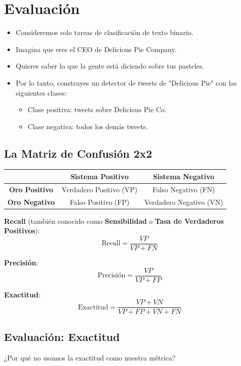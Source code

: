 \documentclass[11pt,fleqn]{book} %
\begin{document}
\section{Evaluación}

\begin{itemize}
 \item Consideremos solo tareas de clasificación de texto binario.
 \item Imagina que eres el CEO de Delicious Pie Company.
 \item Quieres saber lo que la gente está diciendo sobre tus pasteles.
 \item Por lo tanto, construyes un detector de tweets de "Delicious Pie" con las siguientes clases:
\begin{itemize}
\item Clase positiva: tweets sobre Delicious Pie Co.
\item Clase negativa: todos los demás tweets.
\end{itemize}
\end{itemize}



\subsection{La Matriz de Confusión 2x2}
\begin{table}[h]
\centering
\begin{tabular}{|c|c|c|}
\hline
\textbf{} & \textbf{Sistema Positivo} & \textbf{Sistema Negativo} \\
\hline
\textbf{Oro Positivo} & Verdadero Positivo (VP) & Falso Negativo (FN) \\
\hline
\textbf{Oro Negativo} & Falso Positivo (FP) & Verdadero Negativo (VN) \\
\hline
\end{tabular}
\end{table}

\textbf{Recall} (también conocido como \textbf{Sensibilidad} o \textbf{Tasa de Verdaderos Positivos}):
\[ \text{Recall} = \frac{VP}{VP + FN} \]

\textbf{Precisión}:
\[ \text{Precisión} = \frac{VP}{VP + FP} \]

\textbf{Exactitud}:
\[ \text{Exactitud} = \frac{VP + VN}{VP + FP + VN + FN} \]


\subsection{Evaluación: Exactitud}
¿Por qué no usamos la exactitud como nuestra métrica?
\end{document}
